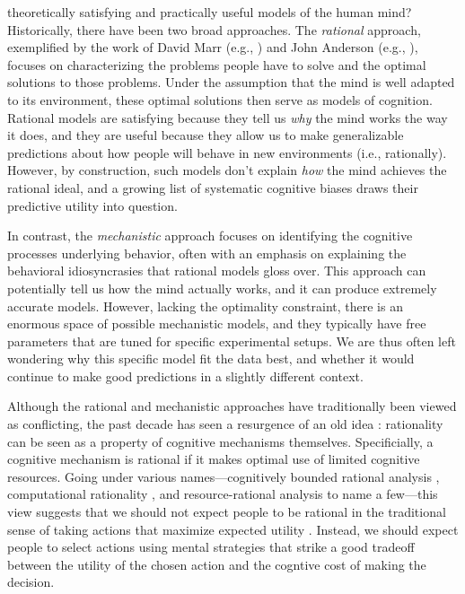 \label{introduction}

 theoretically satisfying and practically useful models of the human mind? Historically, there have been two broad approaches. The \emph{rational} approach, exemplified by the work of David Marr (e.g., \citeyear{marr1982vision}) and John Anderson (e.g., \citeyear{anderson1990adaptive}), focuses on characterizing the problems people have to solve and the optimal solutions to those problems. Under the assumption that the mind is well adapted to its environment, these optimal solutions then serve as models of cognition. Rational models are satisfying because they tell us \emph{why} the mind works the way it does, and they are useful because they allow us to make generalizable predictions about how people will behave in new environments (i.e., rationally). However, by construction, such models don't explain \emph{how} the mind achieves the rational ideal, and a growing list of systematic cognitive biases \citep{kahneman2011thinking} draws their predictive utility into question. 

In contrast, the \emph{mechanistic} approach focuses on identifying the cognitive processes underlying behavior, often with an emphasis on explaining the behavioral idiosyncrasies that rational models gloss over. This approach can potentially tell us how the mind actually works, and it can produce extremely accurate models. However, lacking the optimality constraint, there is an enormous space of possible mechanistic models, and they typically have free parameters that are tuned for specific experimental setups. We are thus often left wondering why this specific model fit the data best, and whether it would continue to make good predictions in a slightly different context.

Although the rational and mechanistic approaches have traditionally been viewed as conflicting, the past decade has seen a resurgence of an old idea \citep{simon1955behavioral}: rationality can be seen as a property of cognitive mechanisms themselves. Specificially, a cognitive mechanism is rational if it makes optimal use of limited cognitive resources. Going under various names---cognitively bounded rational analysis \citep{howes2009rational}, computational rationality \citep{lewis2014computational,gershman2015computational}, and resource-rational analysis \citep{griffiths2015rational,lieder2020resourcerational} to name a few---this view suggests that we should not expect people to be rational in the traditional sense of taking actions that maximize expected utility \citep{vonneumann1944theory}. Instead, we should expect people to select actions using mental strategies that strike a good tradeoff between the utility of the chosen action and the cogntive cost of making the decision.

